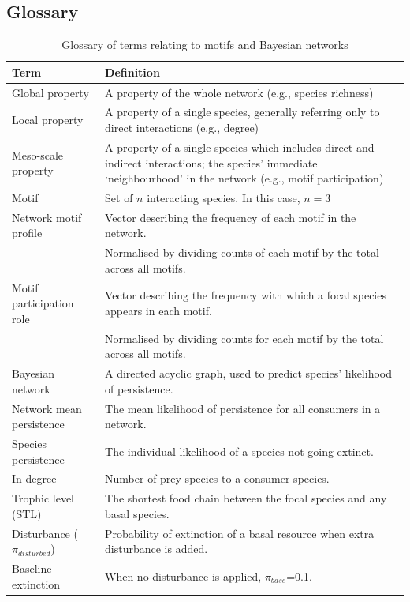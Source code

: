 \documentclass[12pt]{article}
\begin{document}
\begin{spacing}{2.0}
\clearpage

\section{Glossary}

 \begin{table}[hb!]
 \label{glossary}
 \caption{Glossary of terms relating to motifs and Bayesian networks}
     \footnotesize{
 \begin{tabular}{l|m{11cm}}
     Term & Definition \\
     \hline
     Global property & A property of the whole network (e.g., species richness) \\
     Local property & A property of a single species, generally referring only to direct interactions (e.g., degree) \\
     Meso-scale property &  A property of a single species which includes direct and indirect interactions; the species' immediate `neighbourhood' in the network (e.g., motif participation) \\
     Motif & Set of $n$ interacting species. In this case, $n=3$ \\
     Network motif profile & Vector describing the frequency of each motif in the network. \\
     & Normalised by dividing counts of each motif by the total across all motifs.\\
     Motif participation role & Vector describing the frequency with which a focal species appears in each motif.\\
     & Normalised by dividing counts for each motif by the total across all motifs. \\
     Bayesian network & A directed acyclic graph, used to predict species' likelihood of persistence. \\
     Network mean persistence & The mean likelihood of persistence for all consumers in a network.\\
     Species persistence & The individual likelihood of a species not going extinct.\\
     In-degree & Number of prey species to a consumer species.\\
     Trophic level (STL) & The shortest food chain between the focal species and any basal species.\\
     Disturbance ($\pi_{disturbed}$) & Probability of extinction of a basal resource when extra disturbance is added. \\
     Baseline extinction &  When no disturbance is applied, $\pi_{base}$=0.1.\\
 \end{tabular}}
 \end{table}
 

\end{spacing}
\end{document}
